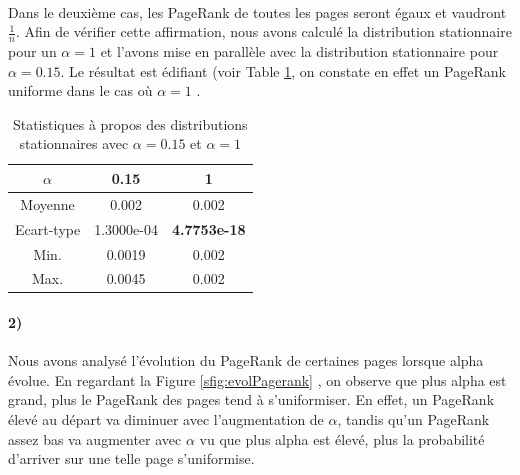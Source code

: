 \documentclass[a4paper,titlepage]{report}
\begin{document}
\paragraph{}
Dans le deuxième cas, les PageRank de toutes les pages seront égaux et vaudront $\frac{1}{n}$. Afin de vérifier cette affirmation, nous avons calculé la distribution stationnaire pour un $\alpha = 1$ et l'avons mise en parallèle avec la distribution stationnaire pour $\alpha = 0.15$. Le résultat est édifiant (voir Table \ref{tab:alpha_comp}, on constate en effet un PageRank uniforme dans le cas où $\alpha = 1$ .
\begin{table}[h]
	\center
	\begin{tabular}{|c|c|c|}
		\hline 
		$\alpha$   & 0.15  & 1 \\
		\hline
	 	Moyenne    & 0.002 & 0.002\\
	 	Ecart-type & 1.3000e-04 & \textbf{4.7753e-18} \\
	 	Min.       & 0.0019 & 0.002\\
	 	Max.       & 0.0045 & 0.002\\
	 	\hline
	\end{tabular}
	\caption{Statistiques à propos des distributions stationnaires avec $\alpha = 0.15$ et $\alpha = 1$}
	\label{tab:alpha_comp}
\end{table}
\paragraph{2)}
Nous avons analysé l'évolution du PageRank de certaines pages lorsque alpha évolue. En regardant la Figure \ref{sfig:evolPagerank} , on observe que plus alpha est grand, plus le PageRank des pages tend à s'uniformiser. En effet, un PageRank élevé au départ va diminuer avec l'augmentation de $\alpha$, tandis qu'un PageRank assez bas va augmenter avec $\alpha$ vu que plus alpha est élevé, plus la probabilité d'arriver sur une telle page s'uniformise.   
\end{document}
